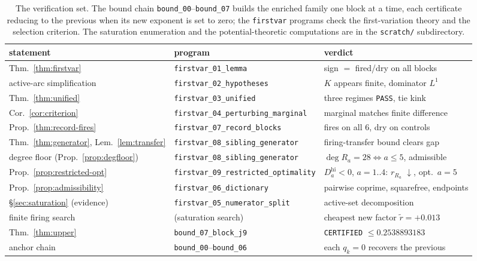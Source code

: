 \documentclass[11pt,reqno]{amsart}
\theoremstyle{plain}
\theoremstyle{definition}
\theoremstyle{remark}
\newcommand{\rb}[1]{r_{#1}}   %
\begin{document}
\begin{table}[ht]
\centering\small
\renewcommand{\arraystretch}{1.15}
\begin{tabular}{@{}lll@{}}
\toprule
statement & program & verdict\\
\midrule
Thm.~\ref{thm:firstvar} & \texttt{firstvar\_01\_lemma} & sign $=$ fired/dry on all blocks\\
\quad active-arc simplification & \texttt{firstvar\_02\_hypotheses} & $K$ appears finite, dominator $L^1$\\
Thm.~\ref{thm:unified} & \texttt{firstvar\_03\_unified} & three regimes \texttt{PASS}, tie kink\\
Cor.~\ref{cor:criterion} & \texttt{firstvar\_04\_perturbing\_marginal} & marginal matches finite difference\\
Prop.~\ref{thm:record-fires} & \texttt{firstvar\_07\_record\_blocks} & fires on all 6, dry on controls\\
Thm.~\ref{thm:generator}, Lem.~\ref{lem:transfer} & \texttt{firstvar\_08\_sibling\_generator} & firing-transfer bound clears gap\\
\quad degree floor (Prop.~\ref{prop:degfloor}) & \texttt{firstvar\_08\_sibling\_generator} & $\deg R_a{=}28\!\iff\!a{\le}5$, admissible\\
Prop.~\ref{prop:restricted-opt} & \texttt{firstvar\_09\_restricted\_optimality} & $D_a^{\mathrm{hi}}{<}0$, $a{=}1..4$: $\rb{R_a}$ $\downarrow$, opt.\ $a{=}5$\\
Prop.~\ref{prop:admissibility} & \texttt{firstvar\_06\_dictionary} & pairwise coprime, squarefree, endpoints\\
\S\ref{sec:saturation} (evidence) & \texttt{firstvar\_05\_numerator\_split} & active-set decomposition\\
\quad finite firing search & (saturation search) & cheapest new factor $\widetilde r=+0.013$\\
Thm.~\ref{thm:upper} & \texttt{bound\_07\_block\_j9} & \texttt{CERTIFIED} $\le0.2538893183$\\
\quad anchor chain & \texttt{bound\_00}--\texttt{bound\_06} & each $q_k{=}0$ recovers the previous\\
\bottomrule
\end{tabular}
\medskip
\caption{The verification set. The bound chain \texttt{bound\_00}--\texttt{bound\_07}
builds the enriched family one block at a time, each certificate reducing to the
previous when its new exponent is set to zero; the \texttt{firstvar} programs check
the first-variation theory and the selection criterion. The saturation enumeration and
the potential-theoretic computations are in the \texttt{scratch/} subdirectory.}
\label{tab:verify}
\end{table}
\end{document}
